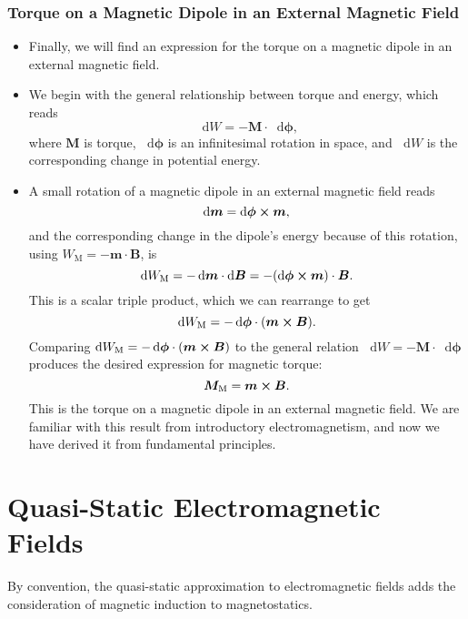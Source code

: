 \documentclass[11pt, a4paper]{article}
\newcommand{\diff}{\mathop{}\!\mathrm{d}} %
\renewcommand{\vec}[1]{\bm{#1}} %
\newcommand{\B}{\vec{B}} %
\newcommand{\M}{\vec{M}}  %
\newcommand{\m}{\vec{m}}  %
\begin{document}
\subsubsection{Torque on a Magnetic Dipole in an External Magnetic Field}
\begin{itemize}
	\item Finally, we will find an expression for the torque on a magnetic dipole in an external magnetic field. 

	\item We begin with the general relationship between torque and energy, which reads
	\begin{equation*}
		\diff W = - \vec{M} \cdot \diff \vec{\phi},
	\end{equation*}
    where $ \M $ is torque, $ \diff \vec{\phi} $ is an infinitesimal rotation in space, and $ \diff W $ is the corresponding change in potential energy.
	
	\item A small rotation of a magnetic dipole in an external magnetic field reads
	\begin{equation*}
		\diff \vec{m} = \diff \vec{\phi} \cross \m,
	\end{equation*}
	and the corresponding change in the dipole's energy because of this rotation, using $ W_{\text{M}} = - \m \cdot \B $, is
	\begin{equation*}
		\diff W_{\text{M}} = - \diff \m \cdot \diff \B = - (\diff \vec{\phi} \cross \m)\cdot \B.
	\end{equation*}
	This is a scalar triple product, which we can rearrange to get
	\begin{equation*}
		\diff W_{\text{M}} = - \diff \vec{\phi} \cdot (\m \cross \B).
	\end{equation*}
    Comparing $ \diff W_{\text{M}} = - \diff \vec{\phi} \cdot (\m \cross \B) $ to the general relation $ \diff W = - \vec{M} \cdot \diff \vec{\phi} $ produces the desired expression for magnetic torque:
	\begin{equation*}
		\vec{M}_{\text{M}} = \m \cross \B.
	\end{equation*}
	This is the torque on a magnetic dipole in an external magnetic field. We are familiar with this result from introductory electromagnetism, and now we have derived it from fundamental principles.
\end{itemize}

\newpage
\section{Quasi-Static Electromagnetic Fields}
By convention, the quasi-static approximation to electromagnetic fields adds the consideration of magnetic induction to magnetostatics. 
\end{document}
